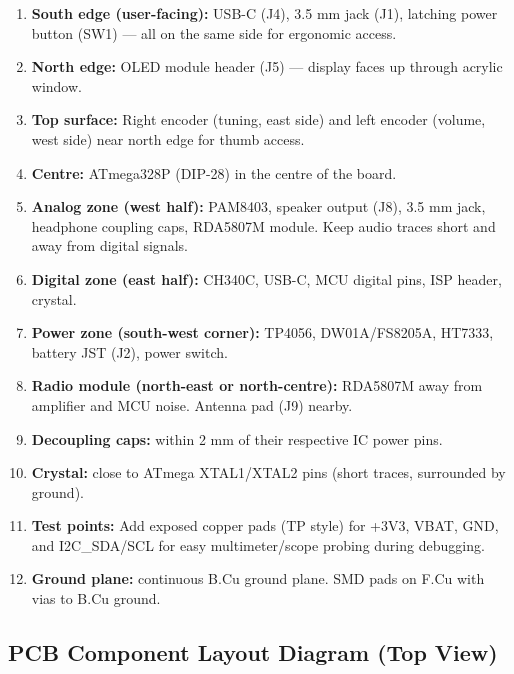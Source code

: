 \documentclass[a4paper,11pt]{article}
\renewcommand*{\,}{ }%
\begin{document}
\begin{enumerate}
    \item \textbf{South edge (user-facing):} USB-C (J4), 3.5\,mm jack (J1), latching power button (SW1) --- all on the same side for ergonomic access.
    \item \textbf{North edge:} OLED module header (J5) --- display faces up through acrylic window.
    \item \textbf{Top surface:} Right encoder (tuning, east side) and left encoder (volume, west side) near north edge for thumb access.
    \item \textbf{Centre:} ATmega328P (DIP-28) in the centre of the board.
    \item \textbf{Analog zone (west half):} PAM8403, speaker output (J8), 3.5\,mm jack, headphone coupling caps, RDA5807M module. Keep audio traces short and away from digital signals.
    \item \textbf{Digital zone (east half):} CH340C, USB-C, MCU digital pins, ISP header, crystal.
    \item \textbf{Power zone (south-west corner):} TP4056, DW01A/FS8205A, HT7333, battery JST (J2), power switch.
    \item \textbf{Radio module (north-east or north-centre):} RDA5807M away from amplifier and MCU noise. Antenna pad (J9) nearby.
    \item \textbf{Decoupling caps:} within 2\,mm of their respective IC power pins.
    \item \textbf{Crystal:} close to ATmega XTAL1/XTAL2 pins (short traces, surrounded by ground).
    \item \textbf{Test points:} Add exposed copper pads (TP style) for +3V3, VBAT, GND, and I2C\_SDA/SCL for easy multimeter/scope probing during debugging.
    \item \textbf{Ground plane:} continuous B.Cu ground plane. SMD pads on F.Cu with vias to B.Cu ground.
\end{enumerate}

\subsection{PCB Component Layout Diagram (Top View)}
\end{document}
